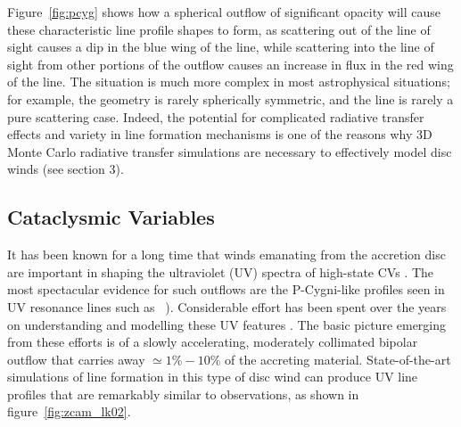 Figure~\ref{fig:pcyg} shows how a spherical outflow of significant opacity will 
cause these characteristic line profile shapes to form, 
as scattering out of the line of sight 
causes a dip in the blue wing of the line, while scattering into the 
line of sight from other portions of the outflow causes an increase in flux
in the red wing of the line. The situation is much more complex in most
astrophysical situations; for example, the geometry is rarely spherically 
symmetric, and the line is rarely a pure scattering case. Indeed, the potential 
for complicated radiative transfer effects and variety in line formation mechanisms
is one of the reasons why 3D Monte Carlo radiative transfer simulations are necessary
to effectively model disc winds (see section 3).



\subsection{Cataclysmic Variables}

It has been known for a long time that winds emanating from the
accretion disc are important in shaping the ultraviolet (UV) spectra
of high-state CVs \citep{heap1978, greensteinoke1982}. 
The most spectacular evidence for such
outflows are the P-Cygni-like profiles seen in UV resonance lines such as
\civfull\ \citep[][see figure~\ref{fig:cordova}]{cordova1982}). 
Considerable effort has been spent over the
years on understanding and modelling these UV features 
\citep[e.g.][]{drewverbunt1985,maucheraymond1987,SV93,KWD95,
kd1997,knigge1997,LK02,noebauer,puebla2011}. 
The basic picture emerging from these efforts is
of a slowly accelerating, moderately collimated bipolar
outflow that carries away $\simeq 1\% - 10\%$ of the accreting
material. State-of-the-art simulations of line formation in this type
of disc wind can produce UV line profiles that are remarkably similar
to observations, as shown in figure~\ref{fig:zcam_lk02}.

